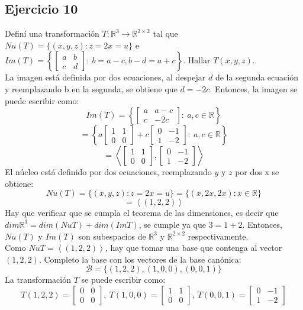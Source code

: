 \documentclass[a4paper,12pt]{article}
\begin{document}
\subsection{Ejercicio 10}
Definí una transformación $T:\mathds{R}^3\to\mathds{R}^{2\times 2}$ tal que $Nu(T)= \{ (x,y,z) : z=2x=u \}$ e $Im(T)= \left \{  \begin{bmatrix} a & b \\ c & d \end{bmatrix} : \ b =a-c,  b-d=a+c \right \} $. Hallar $T(x,y,z)$. \\
La imagen está definida por dos ecuaciones, al despejar $d$ de la segunda ecuación y reemplazando b en la segunda, se obtiene que $d=-2c$. Entonces, la imagen se puede escribir como:
$$
Im(T)= \left \{  \begin{bmatrix} a & a-c \\ c & -2c \end{bmatrix} : \ a,c \in \mathds{R} \right \}
$$
$$
= \left \{ a\begin{bmatrix} 1 & 1 \\ 0 & 0 \end{bmatrix} + c\begin{bmatrix} 0 & -1 \\ 1 & -2 \end{bmatrix} : \ a,c \in \mathds{R} \right \}
$$
$$
= \left \langle \begin{bmatrix} 1 & 1 \\ 0 & 0 \end{bmatrix}, \begin{bmatrix} 0 & -1 \\ 1 & -2 \end{bmatrix} \right \rangle
$$
El núcleo está definido por dos ecuaciones, reemplazando $y$ y $z$ por dos x se obtiene:
$$
Nu(T)= \{ (x,y,z) : z=2x=u \} = \{ (x,2x,2x) : x \in \mathds{R} \}
$$
$$
= \left \langle (1,2,2) \right \rangle
$$
Hay que verificar que se cumpla el teorema de las dimensiones, es decir que $dim\mathds{R}^3=dim(NuT)+dim(ImT)$, se cumple ya que $3=1+2$. Entonces, $Nu(T)$ y $Im(T)$ son subespacios de $\mathds{R}^3$ y $\mathds{R}^{2\times 2}$ respectivamente. \\
Como $NuT = \left \langle (1,2,2) \right \rangle$, hay que tomar una base que contenga al vector $(1,2,2)$. Completo la base con los vectores de la base canónica:
$$
\mathcal{B}= \{ (1,2,2), (1,0,0), (0,0,1) \}
$$
La transformación $T$ se puede escribir como:
$$
T(1,2,2)= \begin{bmatrix} 0 & 0 \\ 0 & 0 \end{bmatrix}, \ T(1,0,0)= \begin{bmatrix} 1 & 1 \\ 0 & 0 \end{bmatrix}, \ T(0,0,1)= \begin{bmatrix} 0 & -1 \\ 1 & -2 \end{bmatrix}
$$
\end{document}
